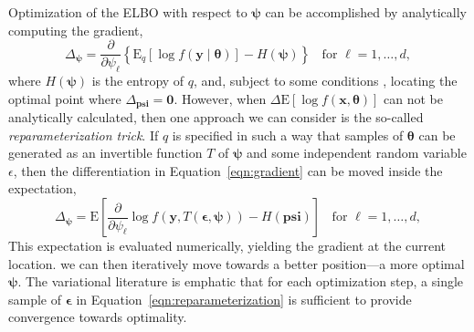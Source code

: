 Optimization of the ELBO with respect to $\bm{\psi}$ can be accomplished by
    analytically computing the gradient,
    \begin{equation}
        \label{eqn:gradient}
        \Delta_{\bm{\psi}} = \frac{\partial}{\partial \psi_{\ell}}
            \left\lbrace\text{E}_{q}\left[\log f(\bm{y}\mid\bm{\theta})\right] 
                - H(\bm{\psi})\right\rbrace
            \;\;\text{ for }\ell = 1,\ldots,d,
    \end{equation}
    where $H(\bm{\psi})$ is the entropy of $q$, and, subject to some conditions ,
    locating the optimal point where $\Delta_{\bm{psi}} = \bm{0}$.  However, when 
    $\Delta \text{E}[\log f(\bm{x},\bm{\theta})]$ can not be analytically calculated, then
    one approach we can consider is the so-called \emph{reparameterization trick}.
    If $q$ is specified in such a way that samples of $\bm{\theta}$ can be generated
    as an invertible function $T$ of $\bm{\psi}$ and some independent random variable 
    $\epsilon$, then the differentiation in Equation~\ref{eqn:gradient} can be 
    moved inside the expectation,
    \begin{equation}
        \label{eqn:reparameterization}
        \Delta_{\bm{\psi}} = \text{E}\left[\frac{\partial}{\partial \psi_\ell}
            \log f\left(\bm{y},T(\bm{\epsilon},\bm{\psi})\right) -
            H(\bm{psi})\right] \;\;\text{ for }\ell = 1,\ldots,d,
    \end{equation}
    This expectation is evaluated numerically, yielding the gradient at the current
    location. we can then iteratively move towards a better position---a more optimal 
    $\bm{\psi}$.  The variational literature is emphatic that for each optimization step,
    a single sample of $\bm{\epsilon}$ in Equation~\ref{eqn:reparameterization} is sufficient
    to provide convergence towards optimality.


